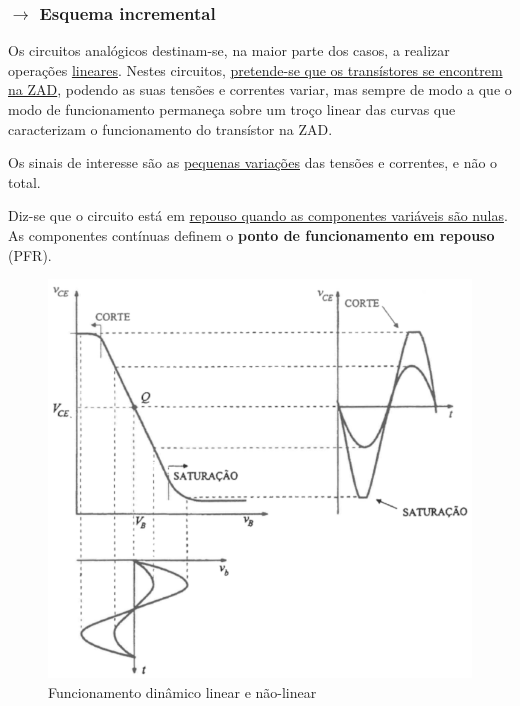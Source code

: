 
\newpage
\subsubsection[3.1.3 Esquema incremental]{$\pmb{\rightarrow}$ Esquema incremental}

Os circuitos analógicos destinam-se, na maior parte dos casos, a realizar operações \underline{lineares}. Nestes circuitos, \underline{pretende-se que os transístores se encontrem na ZAD}, podendo as suas tensões e correntes variar, mas sempre de modo a que o modo de funcionamento permaneça sobre um troço linear das curvas que caracterizam o funcionamento do transístor na ZAD.

Os sinais de interesse são as \underline{pequenas variações} das tensões e correntes, e não o total.

\begin{mdframed}
    \noindent Diz-se que o circuito está em \underline{repouso quando as componentes variáveis são nulas}. As componentes contínuas definem o \textbf{ponto de funcionamento em repouso} (PFR).
\end{mdframed}

\vspace{-0.25em}
\begin{figure}[H]
    \centering
    \includegraphics[width = 0.6\linewidth]{img/3/BJT/funcionamento-dinamico.png}
    \caption{Funcionamento dinâmico linear e não-linear \cite{medeiros:CTBM}}
    \label{fig:funcionamento-dinamico}
\end{figure}

